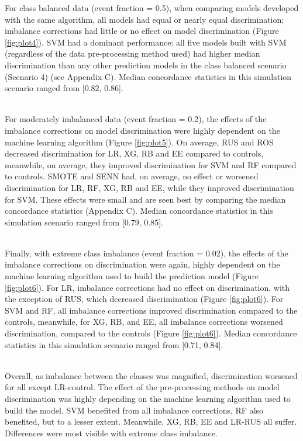 \documentclass[AMA,STIX1COL,]{WileyNJD-v2}
\begin{document}
\hfill\break
For class balanced data (event fraction = 0.5), when comparing models
developed with the same algorithm, all models had equal or nearly equal
discrimination; imbalance corrections had little or no effect on model
discrimination (Figure \ref{fig:plot4}). SVM had a dominant performance:
all five models built with SVM (regardless of the data pre-processing
method used) had higher median discrimination than any other prediction
models in the class balanced scenario (Scenario 4) (see Appendix C).
Median concordance statistics in this simulation scenario ranged from
{[}0.82, 0.86{]}.\\
\strut \\
For moderately imbalanced data (event fraction = 0.2), the effects of
the imbalance corrections on model discrimination were highly dependent
on the machine learning algorithm (Figure \ref{fig:plot5}). On average,
RUS and ROS decreased discrimination for LR, XG, RB and EE compared to
controls, meanwhile, on average, they improved discrimination for SVM
and RF compared to controls. SMOTE and SENN had, on average, no effect
or worsened discrimination for LR, RF, XG, RB and EE, while they
improved discrimination for SVM. These effects were small and are seen
best by comparing the median concordance statistics (Appendix C). Median
concordance statistics in this simulation scenario ranged from {[}0.79,
0.85{]}.\\
\strut \\
Finally, with extreme class imbalance (event fraction = 0.02), the
effects of the imbalance corrections on discrimination were again,
highly dependent on the machine learning algorithm used to build the
prediction model (Figure \ref{fig:plot6}). For LR, imbalance corrections
had no effect on discrimination, with the exception of RUS, which
decreased discrimination (Figure \ref{fig:plot6}). For SVM and RF, all
imbalance corrections improved discrimination compared to the controls,
meanwhile, for XG, RB, and EE, all imbalance corrections worsened
discrimination, compared to the controls (Figure \ref{fig:plot6}).
Median concordance statistics in this simulation scenario ranged from
{[}0.71, 0.84{]}.\\
\strut \\
Overall, as imbalance between the classes was magnified, discrimination
worsened for all except LR-control. The effect of the pre-processing
methods on model discrimination was highly depending on the machine
learning algorithm used to build the model. SVM benefited from all
imbalance corrections, RF also benefited, but to a lesser extent.
Meanwhile, XG, RB, EE and LR-RUS all suffer. Differences were most
visible with extreme class imbalance.
\end{document}
